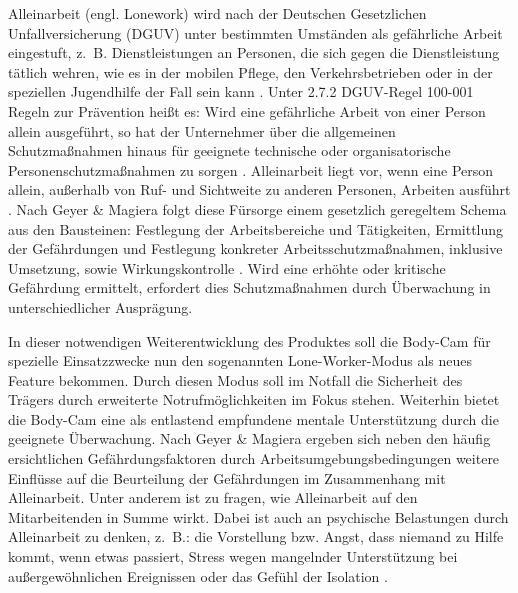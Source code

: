 \documentclass[thesis.tex]{subfiles}
\begin{document}
Alleinarbeit (engl. Lonework) wird nach der Deutschen Gesetzlichen Unfallversicherung (DGUV) unter bestimmten Umständen als gefährliche Arbeit eingestuft, z.~B. Dienstleistungen an Personen, die sich gegen die Dienstleistung tätlich wehren, wie es in der mobilen Pflege, den Verkehrsbetrieben oder in der speziellen Jugendhilfe der Fall sein kann \cite[§~8]{Vorschrift1_DGUV}.
Unter 2.7.2 DGUV-Regel 100-001 \glqq Regeln zur Prävention\grqq{} heißt es: \glqq Wird eine gefährliche Arbeit von einer Person allein ausgeführt, so hat der Unternehmer über die allgemeinen Schutzmaßnahmen hinaus für geeignete technische oder organisatorische Personenschutzmaßnahmen zu sorgen\grqq{} \cite[§~8~(2)]{Vorschrift1_DGUV}.
\glqq Alleinarbeit liegt vor, wenn eine Person allein, außerhalb von Ruf- und Sichtweite zu anderen Personen, Arbeiten ausführt\grqq{} \cite[S.~42]{Regel_100-001}.
Nach Geyer \& Magiera folgt diese Fürsorge einem gesetzlich geregeltem Schema aus den Bausteinen: Festlegung der Arbeitsbereiche und Tätigkeiten, Ermittlung der Gefährdungen und Festlegung konkreter Arbeitsschutzmaßnahmen, inklusive Umsetzung, sowie Wirkungskontrolle \cite[vgl.~S.~42~ff.]{GeyerMagiera2022}.
Wird eine erhöhte oder kritische Gefährdung ermittelt, erfordert dies Schutzmaßnahmen durch Überwachung in unterschiedlicher Ausprägung.

In dieser notwendigen Weiterentwicklung des Produktes soll die Body-Cam für spezielle Einsatzzwecke nun den sogenannten Lone-Worker-Modus als neues Feature bekommen.
Durch diesen Modus soll im Notfall die Sicherheit des Trägers durch erweiterte Notrufmöglichkeiten im Fokus stehen.
Weiterhin bietet die Body-Cam eine als entlastend empfundene mentale Unterstützung durch die geeignete Überwachung.
Nach Geyer \& Magiera ergeben sich \glqq neben den häufig ersichtlichen Gefährdungsfaktoren durch Arbeitsumgebungsbedingungen weitere Einflüsse auf die Beurteilung der Gefährdungen im Zusammenhang mit Alleinarbeit.
Unter anderem ist zu fragen, wie Alleinarbeit auf den Mitarbeitenden in Summe wirkt.
Dabei ist auch an psychische Belastungen durch Alleinarbeit zu denken, z.~B.: die Vorstellung bzw. Angst, dass niemand zu Hilfe kommt, wenn etwas passiert, Stress wegen mangelnder Unterstützung bei außergewöhnlichen Ereignissen oder das Gefühl der Isolation \cite[vgl.~S.~45]{GeyerMagiera2022}.
\end{document}
